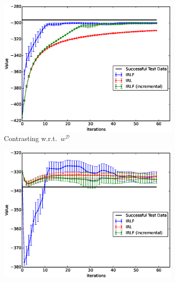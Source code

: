 \documentclass[letterpaper]{article}
\begin{document}
\begin{figure}[t]
  \centering
  \begin{subfigure}[b]{0.475\columnwidth}
    \includegraphics[trim=0.5cm 1cm 2cm 0,clip=true,width=\textwidth]{images/expert_apprentice_contrastive.eps}
    
    \caption{Contrasting w.r.t.\ $w^\mathcal{D}$}
    \label{fig:toy_expert_apprentice_contrastive}
  \end{subfigure}
  \hfill
  \begin{subfigure}[b]{0.475\columnwidth}
    \includegraphics[trim=0.5cm 1cm 2cm 0,clip=true,width=\textwidth]{images/taboo_apprentice_contrastive.eps}
    

\end{subfigure}
\end{figure}
\end{document}
